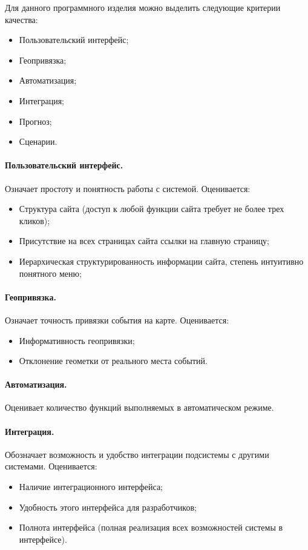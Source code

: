 Для данного программного изделия можно выделить следующие критерии качества:
\begin{itemize}
\item Пользовательский интерфейс;
\item Геопривязка;
\item Автоматизация;
\item Интеграция;
\item Прогноз;
\item Сценарии.
\end{itemize}

\paragraph{Пользовательский интерфейс.}
Означает простоту и понятность работы с системой. Оценивается:
\begin{itemize}
\item Структура сайта (доступ к любой функции сайта требует не более трех кликов);
\item Присутствие на всех страницах сайта ссылки на главную страницу;
\item Иерархическая структурированность информации сайта, степень интуитивно понятного меню;
\end{itemize}

\paragraph{Геопривязка.}
Означает точность привязки события на карте. Оценивается:
\begin{itemize}
\item Информативность геопривязки;
\item Отклонение геометки от реального места событий.
\end{itemize}

\paragraph{Автоматизация.}
Оценивает количество функций выполняемых в автоматическом режиме.

\clearpage
\paragraph{Интеграция.} 
Обозначает возможность и удобство интеграции подсистемы с другими системами. Оценивается:
\begin{itemize}
\item Наличие интеграционного интерфейса;
\item Удобность этого интерфейса для разработчиков;
\item Полнота интерфейса (полная реализация всех возможностей системы в интерфейсе).
\end{itemize}

